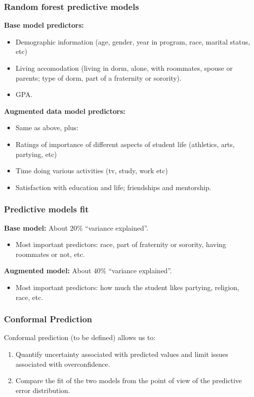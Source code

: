 \documentclass{beamer}
\begin{document}
\begin{frame} \frametitle{Random forest predictive models}
  
  \textbf{Base model predictors:}
  \begin{itemize}
    \item Demographic information (age, gender, year in program, race, marital status, etc)
    \item Living accomodation (living in dorm, alone, with roommates, spouse or parents; type of dorm, part of a fraternity or sorority).
    \item GPA.
  \end{itemize}
  
  \textbf{Augmented data model predictors:}
  \begin{itemize}
    \item Same as above, plus:
    \item Ratings of importance of different aspects of student life (athletics, arts, partying, etc)
    \item Time doing various activities (tv, study, work etc)
    \item Satisfaction with education and life; friendships and mentorship.
  \end{itemize}
  
\end{frame}

\begin{frame} \frametitle{Predictive models fit}

\textbf{Base model:} About $20\%$ ``variance explained''.
\begin{itemize}
  \item Most important predictors: race, part of fraternity or sorority, having roommates or not, etc.
\end{itemize}

\textbf{Augmented model:} About $40\%$ ``variance explained''.
\begin{itemize}
  \item Most important predictors: how much the student likes partying, religion, race, etc.
\end{itemize}

\end{frame}


\begin{frame} \frametitle{Conformal Prediction}

  Conformal prediction (to be defined) allows us to:
  
  \begin{enumerate}
    \item Quantify uncertainty associated with predicted values and limit issues associated with overconfidence.
    \item Compare the fit of the two models from the point of view of the predictive error distribution.
  \end{enumerate}

\end{frame}
\end{document}
